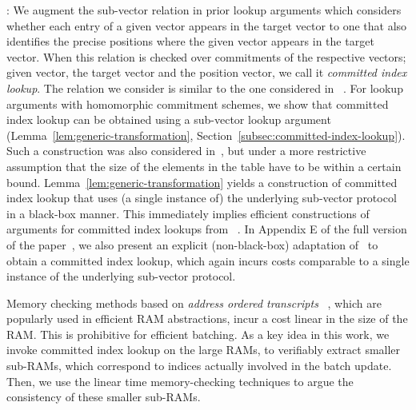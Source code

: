 \medskip

: We augment the sub-vector relation in prior lookup arguments which
considers whether each entry of a given vector appears in the target vector to one that also identifies
the precise positions where the given vector appears in the target vector. When this relation is checked
over commitments of the respective vectors; given vector, the target vector and the position vector, we call
it {\em committed index lookup}. The relation we consider is similar to the one considered in ~\cite{lasso}.
For lookup arguments with homomorphic commitment schemes, we show that committed index lookup can be obtained
using a sub-vector lookup argument (Lemma~\ref{lem:generic-transformation}, Section~\ref{subsec:committed-index-lookup}). Such a construction was
also considered in~\cite{lasso}, but under a more restrictive assumption that the size of the elements in the table have to be
within a certain bound. Lemma~\ref{lem:generic-transformation} yields a construction of committed index lookup that uses (a single instance of) the underlying sub-vector protocol in a black-box manner. This immediately implies
efficient constructions of arguments for committed index lookups from
~\cite{CCS:ZBKMNS22,EPRINT:PosKat22,EPRINT:ZGKMR22,EPRINT:EagFioGab22,PKC:CFFLL24}. In Appendix E of the full version of the paper~\cite{full-ver}, we also present an explicit (non-black-box) adaptation of~\cite{EPRINT:PosKat22} to obtain a committed index lookup, which again incurs costs comparable to a single instance of the underlying sub-vector protocol.

\medskip


Memory checking methods based on {\em address ordered transcripts}
~\cite{NDSS:WSRBW15,USENIX:BCTV14,C:BCGTV13,SP:ZGKPP18}, which are popularly used in
efficient RAM abstractions, incur a cost linear in the size of the RAM. This is prohibitive for efficient batching. As a key idea in this work, we invoke committed index lookup on
the large RAMs, to verifiably extract smaller sub-RAMs, which correspond to indices actually involved in
the batch update. Then, we use the linear time memory-checking techniques to argue the consistency of these
smaller sub-RAMs. 

